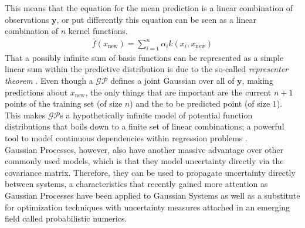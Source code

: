 \documentclass[oneside, 11pt]{book}
\begin{document}
This means that the equation for the mean prediction is a linear combination of observations $\mathbf{y}$, or put differently this equation can be seen as a linear combination of $n$ kernel functions.
\begin{align}
\overline{f}(x_{\text{new}})=\sum_{i=1}^n\alpha_ik(x_i,x_{\text{new}})
\end{align}
That a possibly infinite sum of basis functions can be represented as a simple linear sum within the predictive distribution is due to the so-called \emph{representer theorem} \citep{scholkopf2001generalized}. Even though a $\mathcal{GP}$ defines a joint Gaussian over all of $\mathbf{y}$, making predictions about $x_{\text{new}}$, the only things that are important are the current $n+1$ points of the training set (of size $n$) and the to be predicted point (of size $1$). This makes $\mathcal{GP}$s a hypothetically infinite model of potential function distributions that boils down to a finite set of linear combinations; a powerful tool to model continuous dependencies within regression problems \citep{kapoor2007active}.\\
Gaussian Processes, however, also have another massive advantage over other commonly used models, which is that they model uncertainty directly via the covariance matrix. Therefore, they can be used to propagate uncertainty directly between systems, a characteristics that recently gained more attention as Gaussian Processes have been applied to Gaussian Systems as well as a substitute for optimization techniques with uncertainty measures attached in an emerging field called probabilistic numerics.
\end{document}
